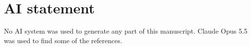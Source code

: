 \documentclass[conference, a4paper]{IEEEtran}
\begin{document}



\section*{AI statement}
No AI system was used to generate any part of this manuscript. Claude Opus 5.5 was used to find some of the references. 
\end{document}
